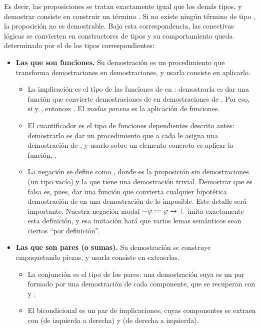 Es decir, las proposiciones se tratan exactamente igual que los demás tipos, y demostrar  consiste en construir un término . Si no existe ningún término de tipo , la proposición no es demostrable. Bajo esta correspondencia, las conectivas lógicas se convierten en constructores de tipos y su comportamiento queda determinado por el de los tipos correspondientes:

\begin{itemize}
  \item \textbf{Las que son funciones.} Su demostración es un procedimiento que transforma demostraciones en demostraciones, y usarla consiste en aplicarlo.
        \begin{itemize}
          \item La implicación  es el tipo de las funciones de  en : demostrarla es dar una función que convierte demostraciones de  en demostraciones de . Por eso, si  y , entonces . El \emph{modus ponens} es la aplicación de funciones.
          \item El cuantificador  es el tipo de funciones dependientes descrito antes: demostrarlo es dar un procedimiento que a cada  le asigna una demostración de , y usarlo sobre un elemento concreto  es aplicar la función, .
          \item La negación  se define como , donde  es la proposición sin demostraciones (un tipo vacío) y  la que tiene una demostración trivial. Demostrar que  es falsa es, pues, dar una función que convierta cualquier hipotética demostración de  en una demostración de lo imposible. Este detalle será importante. Nuestra negación modal $\mathord{\sim}\varphi := \varphi \to \bot$ imita exactamente esta definición, y esa imitación hará que varios lemas semánticos sean ciertos ``por definición''.
        \end{itemize}
  \item \textbf{Las que son pares (o sumas).} Su demostración se construye empaquetando piezas, y usarla consiste en extraerlas.
        \begin{itemize}
          \item La conjunción  es el tipo de los pares: una demostración suya es un par  formado por una demostración de cada componente, que se recuperan con  y .
          \item El bicondicional  es un par de implicaciones, cuyas componentes se extraen con  (de izquierda a derecha) y  (de derecha a izquierda).

\end{itemize}
\end{itemize}
